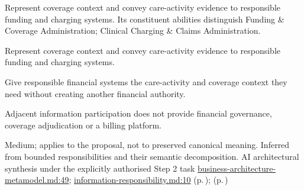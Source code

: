 Represent coverage context and convey care-activity evidence to responsible funding and charging systems. Its constituent abilities distinguish Funding \& Coverage Administration; Clinical Charging \& Claims Administration.



Represent coverage context and convey care-activity evidence to responsible funding and charging systems.



Give responsible financial systems the care-activity and coverage context they need without creating another financial authority.



Adjacent information participation does not provide financial governance, coverage adjudication or a billing platform.


Medium; applies to the proposal, not to preserved canonical meaning.
Inferred from bounded responsibilities and their semantic decomposition. AI architectural synthesis under the explicitly authorised Step 2 task \hyperref[evidence:4bac85accd34ce0b]{business-architecture-metamodel.md:49}; \hyperref[evidence:be61392fefb4bb10]{information-responsibility.md:10}
 (p.\,\pageref{cap:bec-funding-coverage-administration});  (p.\,\pageref{cap:bec-clinical-charging-claims-administration})
